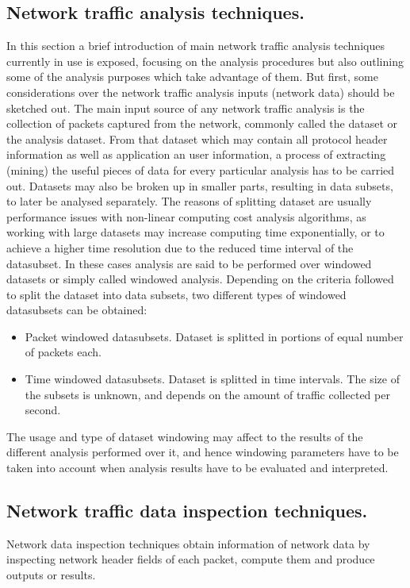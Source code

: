 \documentclass[thesis=M,english]{FITthesis}[2011/07/15]
\begin{document}
\subsection{Network traffic analysis techniques.}
In this section a brief introduction of main network traffic analysis techniques currently in use is exposed, focusing on the analysis procedures but also outlining some of the
analysis purposes which take advantage of them. But first, some considerations over the network traffic analysis inputs (network data) should be sketched out. The main input source of any network traffic analysis is the collection of packets captured from the network, commonly called the dataset or the analysis dataset. From that dataset which may contain all protocol header information as well as application an user information, a process of extracting (mining) the useful pieces of data for every particular analysis has to be carried out.
Datasets may also be broken up in smaller parts, resulting in data subsets, to later be analysed separately. The reasons of splitting dataset are usually performance issues with non-linear computing cost analysis algorithms, as working with large datasets may increase computing time exponentially, or to achieve a higher time resolution due to the reduced time interval of the datasubset. In these cases analysis are said to be performed over windowed datasets or simply called windowed analysis. Depending on the criteria followed to split the dataset into data subsets, two different types of windowed datasubsets can be obtained:
\begin{itemize}
\item Packet windowed datasubsets. Dataset is splitted in portions of equal number of packets each.
\item Time windowed datasubsets. Dataset is splitted in time intervals. The size of the subsets is unknown, and depends on the amount of traffic collected per second.
\end{itemize}

The usage and type of dataset windowing may affect to the results of the different analysis performed over it, and hence windowing parameters have to be taken into account when analysis results have to be evaluated and interpreted.

\subsection{Network traffic data inspection techniques.}
Network data inspection techniques obtain information of network data by inspecting network header fields of each packet, compute them and produce outputs or results.
\end{document}
